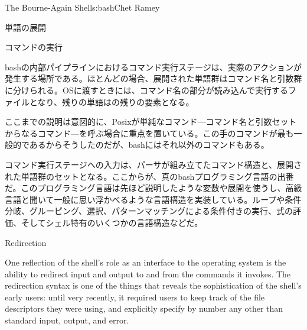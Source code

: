 \begin{aosachapter}{The Bourne-Again Shell}{s:bash}{Chet Ramey}
\begin{aosasect1}{単語の展開}
\end{aosasect1}

\begin{aosasect1}{コマンドの実行}

bashの内部パイプラインにおけるコマンド実行ステージは、実際のアクションが発生する場所である。ほとんどの場合、展開された単語群はコマンド名と引数群に分けられる。OSに渡すときには、コマンド名の部分が読み込んで実行するファイルとなり、残りの単語はの残りの要素となる。

ここまでの説明は意図的に、Posixが単純なコマンド---コマンド名と引数セットからなるコマンド---を呼ぶ場合に重点を置いている。この手のコマンドが最も一般的であるからそうしたのだが、bashにはそれ以外のコマンドもある。

コマンド実行ステージへの入力は、パーサが組み立てたコマンド構造と、展開された単語群のセットとなる。ここからが、真のbashプログラミング言語の出番だ。このプログラミング言語は先ほど説明したような変数や展開を使うし、高級言語と聞いて一般に思い浮かべるような言語構造を実装している。ループや条件分岐、グルーピング、選択、パターンマッチングによる条件付きの実行、式の評価、そしてシェル特有のいくつかの言語構造などだ。

\begin{aosasect2}{Redirection}

One reflection of the shell's role as an interface to the operating
system is the ability to redirect input and output to and from the
commands it invokes.  The redirection syntax is one of the things that
reveals the sophistication of the shell's early users: until very
recently, it required users to keep track of the file descriptors they
were using, and explicitly specify by number any other than standard
input, output, and error.


\end{aosasect2}
\end{aosasect1}
\end{aosachapter}
